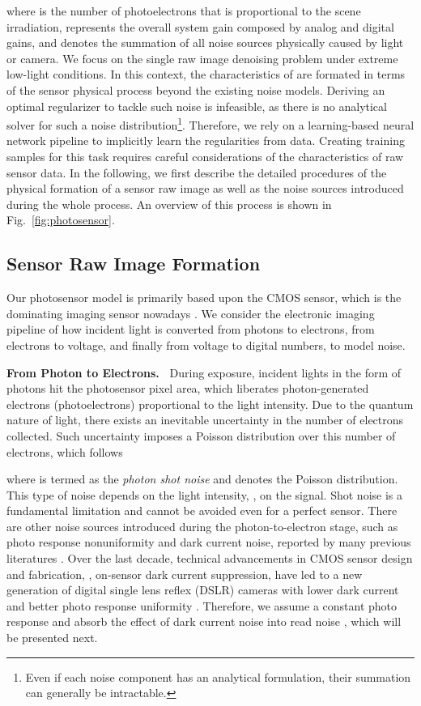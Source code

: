 \documentclass[10pt,twocolumn,letterpaper]{article}
\begin{document}
where  is the number of photoelectrons that is proportional to the scene
irradiation,  represents the overall system gain composed by analog and
digital gains, and  denotes the summation of all noise sources physically caused
by light or camera.
We focus on  the single raw image denoising problem under extreme low-light
conditions. In this context, the characteristics of  are formated in terms of
the sensor
physical process beyond the existing noise models.
Deriving an optimal regularizer to tackle such noise is infeasible, as
there is no analytical solver for such a noise distribution\footnote{Even if each noise component has an analytical formulation, their summation can generally be intractable.}. Therefore, we rely on a learning-based neural network
pipeline to implicitly learn the regularities from data. Creating training
samples for this task requires careful considerations of the characteristics of
raw sensor data. In the following, we first describe the detailed procedures of
the physical formation of a sensor raw image as well as the noise sources
introduced during the whole process. An overview of this process is shown in
Fig.~\ref{fig:photosensor}.

\subsection{Sensor Raw Image Formation} \label{sec: raw formation}
Our photosensor model is primarily based upon the CMOS sensor, which is the dominating imaging sensor nowadays \cite{grandviewresearch}. 
  We consider the electronic imaging pipeline of how incident light is converted from
photons to electrons, from electrons to voltage, and finally from voltage to
digital numbers, to model noise.

\vspace{3pt}
\noindent\textbf{From Photon to Electrons.~}
During exposure, incident lights in the form of photons hit the photosensor pixel area, which liberates photon-generated electrons
(photoelectrons) proportional to the light
intensity. 
Due to the quantum nature of light, there exists an inevitable
uncertainty in the number of electrons collected. Such uncertainty imposes a Poisson distribution over this number of electrons, which follows
\vspace{-1mm}
 
where  is termed as the \textit{photon shot noise} and  denotes the
Poisson distribution. This type of noise depends on the light intensity, \ie, on
the signal. Shot noise is a fundamental limitation and cannot be avoided even
for a perfect sensor. There are other noise sources introduced during the
photon-to-electron stage, such as photo response nonuniformity and dark current
noise, reported by many previous literatures \cite{Healey1994Radiometric,Gow2007A,Wach2004Noise,Baer2006A}. Over the last decade, technical advancements
in CMOS sensor design and fabrication, \eg, on-sensor dark current suppression,
have led to a new generation of digital single lens reflex (DSLR) cameras with lower dark current and better
photo response uniformity \cite{Fossum2014A,lin2016high}. Therefore, we assume a constant
photo response and absorb the effect of dark current noise  into read noise , which will be presented next.
 
\end{document}
